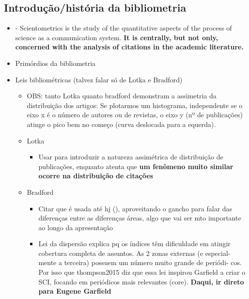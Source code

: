 \documentclass[11pt]{article}
\begin{document}
\subsection{Introdução/história da bibliometria}
\label{sec:org61a5294}
\begin{itemize}
\item \cite{mingers2015} -  Scientometrics is the study of the quantitative aspects of the process of science as a communication system. \textbf{It is centrally, but not only, concerned with the analysis of citations in the academic literature.}
\item Primórdios da bibliometria
\item Leis bibliométricas (talvez falar só de Lotka e Bradford)
\begin{itemize}
\item OBS: tanto Lotka quanto bradford demonstram a assimetria da distribuição dos artigos: Se plotarmos um  histograma,  independente se o eixo x é o número de autores ou de revistas, o eixo y (nº de publicações) atinge o pico bem no começo (curva deslocada para a equerda).
\item Lotka
\begin{itemize}
\item Usar para introduzir a natureza assimétrica de distribuição de publicações, enquanto atenta que \textbf{um fenômeno muito similar ocorre na distribuição de citações}
\end{itemize}

\item Bradford
\begin{itemize}
\item Citar que é usada até hj (\cite{mugnaini2019}), aproveitando o gancho para falar das diferenças entre as diferenças áreas, algo que vai ser mto importante ao longo da apresentação
\item Lei da dispersão explica pq os índices têm dificuldade em atingir cobertura completa de assuntos. As 2 zonas externas (e especial- mente a terceira) possuem um número muito grande de periódi- cos. Por isso que thompson2015 diz que essa lei inspirou Garfield a criar o SCI, focando em periódicos mais relevantes (core). \textbf{Daqui, ir direto para Eugene Garfield}
\end{itemize}


\end{itemize}
\end{itemize}
\end{document}
